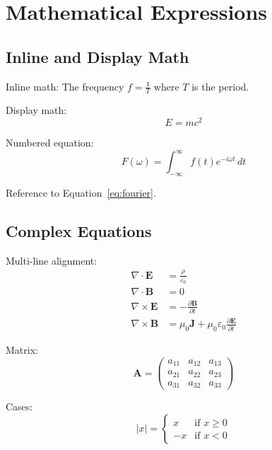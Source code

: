 \documentclass[12pt, a4paper]{article}
\begin{document}

\section{Mathematical Expressions}
\label{sec:math}

\subsection{Inline and Display Math}

Inline math: The frequency $f = \frac{1}{T}$ where $T$ is the period.

Display math:
\[
    E = mc^2
\]

Numbered equation:
\begin{equation}
    \label{eq:fourier}
    F(\omega) = \int_{-\infty}^{\infty} f(t) e^{-i\omega t} \, dt
\end{equation}

Reference to Equation~\eqref{eq:fourier}.

\subsection{Complex Equations}

Multi-line alignment:
\begin{align}
    \nabla \cdot \mathbf{E} &= \frac{\rho}{\varepsilon_0} \\
    \nabla \cdot \mathbf{B} &= 0 \\
    \nabla \times \mathbf{E} &= -\frac{\partial \mathbf{B}}{\partial t} \\
    \nabla \times \mathbf{B} &= \mu_0 \mathbf{J} + \mu_0 \varepsilon_0 \frac{\partial \mathbf{E}}{\partial t}
\end{align}

Matrix:
\[
    \mathbf{A} = \begin{pmatrix}
        a_{11} & a_{12} & a_{13} \\
        a_{21} & a_{22} & a_{23} \\
        a_{31} & a_{32} & a_{33}
    \end{pmatrix}
\]

Cases:
\[
    |x| = \begin{cases}
        x & \text{if } x \geq 0 \\
        -x & \text{if } x < 0
    \end{cases}
\]
\end{document}
